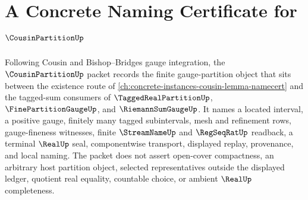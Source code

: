 \chapter{A Concrete Naming Certificate for $\CousinPartitionUp$}
\label{ch:concrete-instances-cousin-partition-namecert}

Following Cousin and Bishop--Bridges gauge integration, the $\CousinPartitionUp$ packet records the finite gauge-partition object that sits between the existence route of \autoref{ch:concrete-instances-cousin-lemma-namecert} and the tagged-sum consumers of $\TaggedRealPartitionUp$, $\FinePartitionGaugeUp$, and $\RiemannSumGaugeUp$. It names a located interval, a positive gauge, finitely many tagged subintervals, mesh and refinement rows, gauge-fineness witnesses, finite $\StreamNameUp$ and $\RegSeqRatUp$ readback, a terminal $\RealUp$ seal, componentwise transport, displayed replay, provenance, and local naming. The packet does not assert open-cover compactness, an arbitrary host partition object, selected representatives outside the displayed ledger, quotient real equality, countable choice, or ambient $\RealUp$ completeness.

